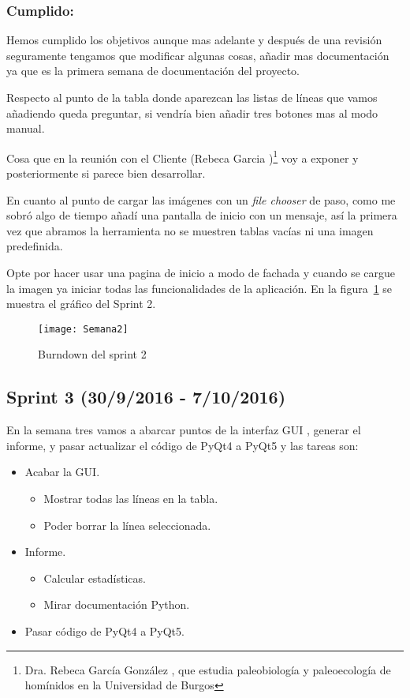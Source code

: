 \subsubsection{Cumplido:}
Hemos cumplido los objetivos aunque mas adelante y después de una revisión seguramente tengamos que modificar algunas cosas, añadir mas documentación ya que es la primera semana de documentación del proyecto.

Respecto al punto de la tabla donde aparezcan las listas de líneas que vamos añadiendo queda preguntar, si vendría bien añadir tres botones mas al modo manual.

Cosa que en la reunión con el Cliente (Rebeca Garcia \cite{Rebeca:garcia})\footnote{ Dra. Rebeca García González \cite{ubu:Rebe},  que estudia paleobiología y paleoecología de homínidos en la Universidad de Burgos} voy a exponer y posteriormente si parece bien desarrollar.

En cuanto al punto de cargar las imágenes con un \textit{file chooser} de paso, como me sobró algo de tiempo añadí una pantalla de inicio con un mensaje, así la primera vez que abramos la herramienta no se muestren tablas vacías ni una imagen predefinida.

Opte por hacer usar una pagina de inicio a modo de fachada y cuando se cargue la imagen ya iniciar todas las funcionalidades de la aplicación.
En la figura~\ref{fig:A.2.2} se muestra el gráfico del Sprint 2.
\begin{figure}[h]
\centering
\texttt{[image: Semana2]}
\caption{Burndown del sprint 2}
\label{fig:A.2.2}
\end{figure}

\subsection{Sprint 3 (30/9/2016 - 7/10/2016)}
En la semana tres vamos a abarcar puntos de la interfaz GUI , generar el informe, y pasar actualizar  el código de PyQt4 a PyQt5 y las tareas son:

\begin{itemize}
	\item Acabar la GUI.
		\begin{itemize}
			\item Mostrar todas las líneas en la tabla.
			\item Poder borrar la línea seleccionada.
		\end{itemize} 
	\item Informe.
		\begin{itemize}
			\item Calcular estadísticas.
			\item Mirar documentación Python.
		\end{itemize}
	\item Pasar código de PyQt4 a PyQt5.
\end{itemize}
